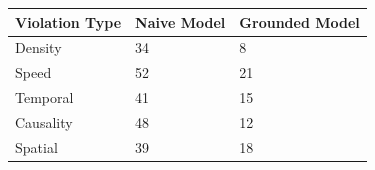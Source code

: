 \begin{tabular}{lll}
\toprule
Violation Type & Naive Model & Grounded Model \\
\midrule
Density & 34 & 8 \\
Speed & 52 & 21 \\
Temporal & 41 & 15 \\
Causality & 48 & 12 \\
Spatial & 39 & 18 \\
\bottomrule
\end{tabular}
